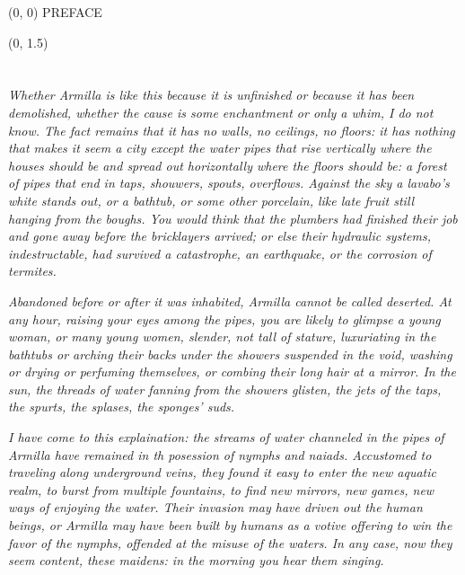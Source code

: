 \documentclass[10pt]{article}
\begin{document}
\begin{textblock}{23}(0, 0)
\center\huge PREFACE
\end{textblock}

\begin{textblock}{11}(0, 1.5)

\section{}

\scriptsize

\textit{Whether Armilla is like this because it is unfinished or because it has 
been demolished, whether the cause is some enchantment or only a whim, I do not
know. The fact remains that it has no walls, no ceilings, no floors: it has
nothing that makes it seem a city except the water pipes that rise vertically
where the houses should be and spread out horizontally where the floors should
be: a forest of pipes that end in taps, shouwers, spouts, overflows. Against
the sky a lavabo's white stands out, or a bathtub, or some other porcelain,
like late fruit still hanging from the boughs. You would think that the
plumbers had finished their job and gone away before the bricklayers arrived;
or else their hydraulic systems, indestructable, had survived a catastrophe, an
earthquake, or the corrosion of termites. }

\textit{Abandoned before or after it was inhabited, Armilla cannot be called
deserted. At any hour, raising your eyes among the pipes, you are likely to
glimpse a young woman, or many young women, slender, not tall of stature,
luxuriating in the bathtubs or arching their backs under the showers suspended
in the void, washing or drying or perfuming themselves, or combing their long
hair at a mirror. In the sun, the threads of water fanning from the showers
glisten, the jets of the taps, the spurts, the splases, the sponges' suds. }

\textit{I have come to this explaination: the streams of water channeled in the
pipes of Armilla have remained in th posession of nymphs and naiads. Accustomed
to traveling along underground veins, they found it easy to enter the new
aquatic realm, to burst from multiple fountains, to find new mirrors, new
games, new ways of enjoying the water. Their invasion may have driven out the
human beings, or Armilla may have been built by humans as a votive offering to
win the favor of the nymphs, offended at the misuse of the waters. In any case,
now they seem content, these maidens: in the morning you hear them singing. }


\end{textblock}
\end{document}
